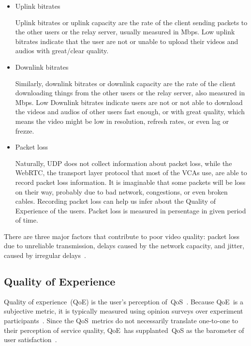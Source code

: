         \begin{itemize}
            \item Uplink bitrates
            
                Uplink bitrates or uplink capacity are the rate of the client sending packets to the other users or the relay server, usually measured in Mbps. Low uplink bitrates indicate that the user are not or unable to upload their videos and audios with great/clear quality. 

            \item Downlink bitrates
            
                Similarly, downlink bitrates or downlink capacity are the rate of the client downloading things from the other users or the relay server, also measured in Mbps. Low Downlink bitrates indicate users are not or not able to download the videos and audios of other users fast enough, or with great quality, which means the video might be low in resolution, refresh rates, or even lag or frezze.

            \item Packet loss
            
                Naturally, UDP does not collect information about packet loss, while the WebRTC, the transport layer protocol that most of the VCAs use, are able to record packet loss information. It is imaginable that some packets will be loss on their way, probably due to bad network, congestions, or even broken cables. Recording packet loss can help us infer about the Quality of Experience of the users. Packet loss is measured in persentage in given period of time. 

        \end{itemize}

        

        There are three major factors that contribute to poor video quality: packet loss due to unreliable transmission, delays caused by the network capacity, and jitter, caused by irregular delays~\autocite{ChenYanjiao2015FQtQ}.

    \subsection{Quality of Experience}\label{introduction:qoe}
        Quality of experience~(QoE) is the user's perception of~QoS~\autocite{ChenYanjiao2015FQtQ}. Because QoE~is a subjective metric, it is typically measured using opinion surveys over experiment participants~\autocite{ChenYanjiao2015FQtQ,RodrriguezDemóstenesZ2014Vqai}. Since the QoS~metrics do not necessarily translate one-to-one to their perception of service quality, QoE~has supplanted~QoS as the barometer of user satisfaction~\autocite{DinakiHosseinEbrahimi2021FVQW}.

